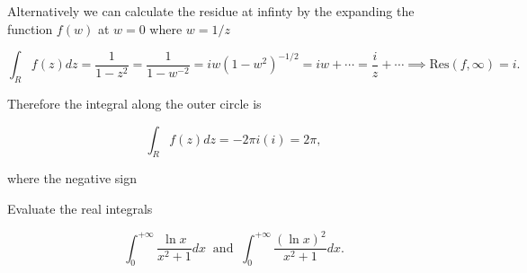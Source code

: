 \documentclass[english,a4paper,12pt]{report}
\begin{document}
{Alternatively we can calculate the residue at infinty by the expanding the function \(f(w)\) at \(w = 0\) where \(w = 1/z\)   

\begin{equation}
    \int_{R}^{} f(z)dz = \frac{1}{1-z^2} = \frac{1}{1-w^{-2} } = iw(1-w^2)^{-1/2} = iw + \cdots = \frac{i}{z} + \cdots \implies \text{Res}(f,\infty) = i.    
\end{equation}

Therefore the integral along the outer circle is 

\begin{equation}
    \int_{R}^{} f(z)dz = -2\pi i (i) = 2\pi , 
\end{equation}

where the negative sign 
~
}

{Evaluate the real integrals 

\begin{equation}
    \int_{0}^{+\infty} \frac{\ln x}{x^2+1} dx ~\text { and }~ \int_{0}^{+\infty} \frac{(\ln x)^2}{x^2+1} dx.    
\end{equation}

~
}
\end{document}
